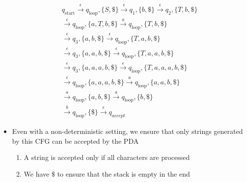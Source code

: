 \begin{frame}[allowframebreaks]
\begin{eqnarray*}
&& q_{\text{start}} \stackrel{\epsilon}{\rightarrow}
q_{\text{loop}}, \{S,\$\} 
\stackrel{\epsilon}{\rightarrow} q_1, \{b,\$\}
\stackrel{\epsilon}{\rightarrow} q_2, \{T,b,\$\} \\
&& \stackrel{\epsilon}{\rightarrow} q_{\text{loop}}, \{a,T,b,\$\} 
\stackrel{a}{\rightarrow}
 q_{\text{loop}}, \{T,b,\$\} \\
&& \stackrel{\epsilon}{\rightarrow} q_{3}, \{a, b,\$\} 
\stackrel{\epsilon}{\rightarrow} q_{\text{loop}}, \{T,a,b,\$\}\\
&& \stackrel{\epsilon}{\rightarrow} q_3, \{a,a,b,\$\}
\stackrel{\epsilon}{\rightarrow} q_{\text{loop}}, \{T,a,a,b,\$\}\\
&& \stackrel{\epsilon}{\rightarrow} q_3, \{a,a,a,b,\$\}
\stackrel{\epsilon}{\rightarrow} q_{\text{loop}}, \{T,a,a,a,b,\$\}\\
&& \stackrel{\epsilon}{\rightarrow} q_{\text{loop}}, \{a,a,a,b,\$\}
\stackrel{a}{\rightarrow} q_{\text{loop}}, \{a,a,b,\$\}\\
&& \stackrel{a}{\rightarrow} q_{\text{loop}},\{a,b,\$\}
\stackrel{a}{\rightarrow} q_{\text{loop}}, \{b,\$\}\\
&& \stackrel{b}{\rightarrow} q_{\text{loop}}, \{\$\}
\stackrel{\epsilon}{\rightarrow} q_{accept}
\end{eqnarray*}
\begin{itemize}
\item 
  Even with a non-deterministic setting, we ensure that only strings generated
  by this CFG can be accepted by the PDA
  \begin{enumerate}
  \item A string is accepted only if all characters are processed
  \item We have $\$$ to ensure that the stack is empty in the end
  \end{enumerate}
\end{itemize}
\end{frame}


